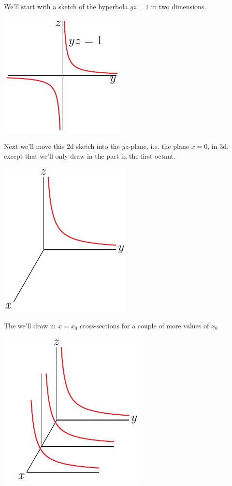 \begin{eg}[$yz=1$]
We'll start with a sketch of the hyperbola $yz=1$ in two dimensions.
\begin{efig}
\begin{center}
   \includegraphics{hyperbola3.pdf}
\end{center}
\end{efig}
Next we'll move this 2d sketch into the $yz$-plane, i.e. the plane $x=0$,
in 3d, except that we'll only draw in the part in the first octant.
\begin{efig}
\begin{center}
   \includegraphics{hyperbolicCylinderA.pdf}
\end{center}
\end{efig}
The we'll draw in $x=x_0$ cross-sections for a couple of more values of
$x_0$
\begin{efig}
\begin{center}
   \includegraphics{hyperbolicCylinderB.pdf}

\end{center}
\end{efig}
\end{eg}

